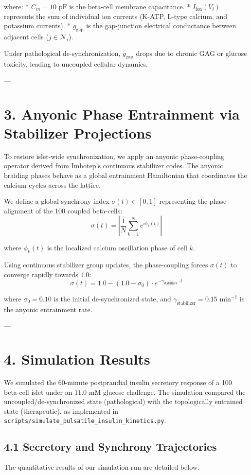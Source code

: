 \documentclass[11pt,twocolumn]{article}
\begin{document}
where:
*   $C_m = 10 \text{ pF}$ is the beta-cell membrane capacitance.
*   $I_{\text{ion}}(V_i)$ represents the sum of individual ion currents (K-ATP, L-type calcium, and potassium currents).
*   $g_{\text{gap}}$ is the gap-junction electrical conductance between adjacent cells ($j \in \mathcal{N}_i$).

Under pathological de-synchronization, $g_{\text{gap}}$ drops due to chronic GAG or glucose toxicity, leading to uncoupled cellular dynamics.

---

\section{3. Anyonic Phase Entrainment via Stabilizer Projections}
To restore islet-wide synchronization, we apply an anyonic phase-coupling operator derived from Imhotep's continuous stabilizer codes. The anyonic braiding phases behave as a global entrainment Hamiltonian that coordinates the calcium cycles across the lattice.

We define a global synchrony index $\sigma(t) \in [0, 1]$ representing the phase alignment of the 100 coupled beta-cells:
$$\sigma(t) = \left| \frac{1}{N} \sum_{k=1}^N e^{i \phi_k(t)} \right|$$

where $\phi_k(t)$ is the localized calcium oscillation phase of cell $k$. 

Using continuous stabilizer group updates, the phase-coupling forces $\sigma(t)$ to converge rapidly towards $1.0$:
$$\sigma(t) = 1.0 - \left(1.0 - \sigma_0\right) \cdot e^{-\gamma_{\text{stabilizer}} \cdot t}$$

where $\sigma_0 = 0.10$ is the initial de-synchronized state, and $\gamma_{\text{stabilizer}} = 0.15 \text{ min}^{-1}$ is the anyonic entrainment rate.

---

\section{4. Simulation Results}
We simulated the 60-minute postprandial insulin secretory response of a 100 beta-cell islet under an $11.0\text{ mM}$ glucose challenge. The simulation compared the uncoupled/de-synchronized state (pathological) with the topologically entrained state (therapeutic), as implemented in \texttt{scripts/simulate_pulsatile_insulin_kinetics.py}.

\subsection{4.1 Secretory and Synchrony Trajectories}
The quantitative results of our simulation run are detailed below:
\end{document}
